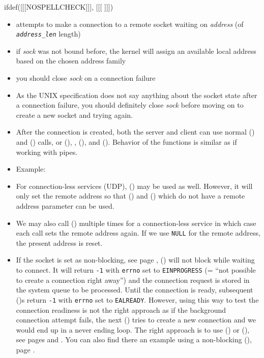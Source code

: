 
\begin{slide}
ifdef([[[NOSPELLCHECK]]], [[[
]]])
\begin{itemize}
\item attempts to make a connection to a remote socket waiting on \emph{address}
(of \emph{\texttt{address\_len}} length) 
\item if \emph{sock} was not bound before, the kernel will assign an available
local address based on the chosen address family
\item you should close \emph{sock} on a connection failure
\end{itemize}
\end{slide}

\label{CONNECT}

\begin{itemize}
\item As the UNIX specification does not say anything about the socket state
after a connection failure, you should definitely close \emph{sock} before
moving on to create a new socket and trying again.
\item After the connection is created, both the server and client can use normal
() and () calls, or (), ,
(), and ().  Behavior of the functions is similar
as if working with pipes.
\item Example: \label{CONNECT_C} 
\item \label{CONNECT_FOR_UDP} For connection-less services (UDP),
() may be used as well.  However, it will only set the remote
address so that () and () which do not have a remote
address parameter can be used.
\item We may also call () multiple times for a connection-less
service in which case each call sets the remote address again.  If we use
\texttt{NULL} for the remote address, the present address is reset.
\item If the socket is set as non-blocking, see page \pageref{FCNTL},
() will not block while waiting to connect.  It will return
\texttt{-1} with \texttt{errno} set to \texttt{EINPROGRESS} (= ``not possible to
create a connection right away'') and the connection request is stored in the
system queue to be processed.  Until the connection is ready, subsequent
()s return \texttt{-1} with \texttt{errno} set to
\texttt{EALREADY}.  However, using this way to test the connection readiness is
not the right approach as if the background connection attempt fails, the next
() tries to create a new connection and we would end up in a
never ending loop.  The right approach is to use () or
(), see pages \pageref{SELECT} and \pageref{POLL}.  You can also
find there an example using a non-blocking (), page
\pageref{NON_BLOCKING_CONNECT}.
\end{itemize}

